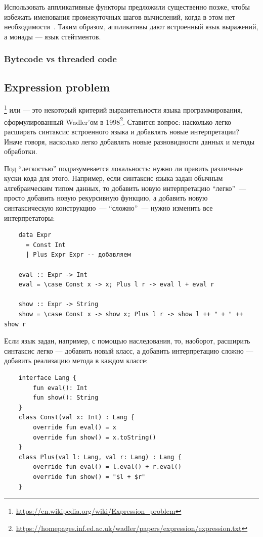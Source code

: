 Использовать аппликативные функторы предложили существенно позже, чтобы избежать именования промежуточных шагов вычислений, когда в этом нет необходимости~\cite{mcbride2008applicative}.
Таким образом, аппликативы дают встроенный язык выражений, а монады --- язык стейтментов.

\subsubsection{Bytecode vs threaded code} \label{subsubsec:threaded-code}



\subsection{Expression problem} \label{subsec:expression-problem}

\footnote{\url{https://en.wikipedia.org/wiki/Expression_problem}} или  --- это некоторый критерий выразительности языка программирования, сформулированный Wadler'ом в 1998\footnote{\url{https://homepages.inf.ed.ac.uk/wadler/papers/expression/expression.txt}}.
Ставится вопрос: насколько легко расширять синтаксис встроенного языка и добавлять новые интерпретации?
Иначе говоря, насколько легко добавлять новые разновидности данных и методы обработки.

Под ``легкостью'' подразумевается локальность: нужно ли править различные куски кода для этого.
Например, если синтаксис языка задан обычным алгебраическим типом данных, то добавить новую интерпретацию ``легко''~--- просто добавить новую рекурсивную функцию, а добавить новую синтаксическую конструкцию~--- ``сложно''~--- нужно изменить все интерпретаторы:
\begin{verbatim}
    data Expr
      = Const Int
      | Plus Expr Expr -- добавляем

    eval :: Expr -> Int
    eval = \case Const x -> x; Plus l r -> eval l + eval r

    show :: Expr -> String
    show = \case Const x -> show x; Plus l r -> show l ++ " + " ++ show r
\end{verbatim}

Если язык задан, например, с помощью наследования, то, наоборот, расширить синтаксис легко --- добавить новый класс, а добавить интерпретацию сложно --- добавить реализацию метода в каждом классе: %
\begin{verbatim}
    interface Lang {
        fun eval(): Int
        fun show(): String
    }
    class Const(val x: Int) : Lang {
        override fun eval() = x
        override fun show() = x.toString()
    }
    class Plus(val l: Lang, val r: Lang) : Lang {
        override fun eval() = l.eval() + r.eval()
        override fun show() = "$l + $r"
    }
\end{verbatim}

